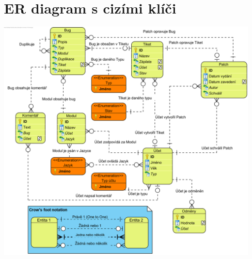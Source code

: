 \documentclass[a4paper, titlepage, final, 12pt]{article}
\begin{document}
\section{ER diagram s cizími klíči}
	\hspace{-1.5cm}
	\includegraphics[keepaspectratio]{ER.png}
\end{document}
